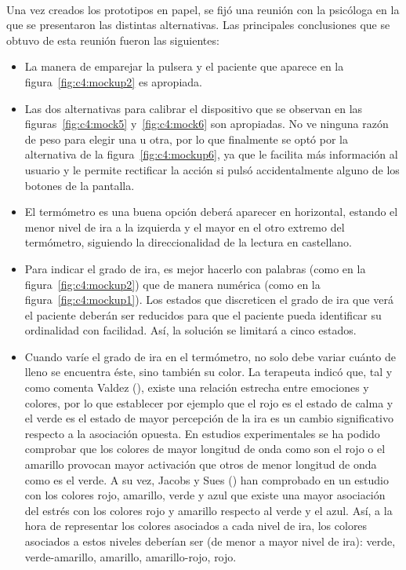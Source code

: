 \paragraph{}
Una vez creados los prototipos en papel, se fijó una reunión con la psicóloga en la que se presentaron las distintas alternativas. Las principales conclusiones que se obtuvo de esta reunión fueron las siguientes:
\begin{itemize}
    \item La manera de emparejar la pulsera y el paciente que aparece en la figura~\ref{fig:c4:mockup2} es apropiada.
    \item Las dos alternativas para calibrar el dispositivo que se observan en las figuras~\ref{fig:c4:mock5} y~\ref{fig:c4:mock6} son apropiadas. No ve ninguna razón de peso para elegir una u otra, por lo que finalmente se optó por la alternativa de la figura~\ref{fig:c4:mockup6}, ya que le facilita más información al usuario y le permite rectificar la acción si pulsó accidentalmente alguno de los botones de la pantalla.
    \item El termómetro es una buena opción deberá aparecer en horizontal, estando el menor nivel de ira a la izquierda y el mayor en el otro extremo del termómetro, siguiendo la direccionalidad de la lectura en castellano.
    \item Para indicar el grado de ira, es mejor hacerlo con palabras (como en la figura~\ref{fig:c4:mockup2}) que de manera numérica (como en la figura~\ref{fig:c4:mockup1}). Los estados que discreticen el grado de ira que verá el paciente deberán ser reducidos para que el paciente pueda identificar su ordinalidad con facilidad. Así, la solución se limitará a cinco estados.
    \item Cuando varíe el grado de ira en el termómetro, no solo debe variar cuánto de lleno se encuentra éste, sino también su color. La terapeuta indicó que, tal y como comenta Valdez (\citeyear{valdez1994effects}), existe una relación estrecha entre emociones y colores, por lo que establecer por ejemplo que el rojo es el estado de calma y el verde es el estado de mayor percepción de la ira es un cambio significativo respecto a la asociación opuesta. En estudios experimentales se ha podido comprobar que los colores de mayor longitud de onda como son el rojo o el amarillo provocan mayor activación que otros de menor longitud de onda como es el verde. A su vez, Jacobs y Sues (\citeyear{jacobs1975effects}) han comprobado en un estudio con los colores rojo, amarillo, verde y azul que existe una mayor asociación del estrés con los colores rojo y amarillo respecto al verde y el azul. Así, a la hora de representar los colores asociados a cada nivel de ira, los colores asociados a estos niveles deberían ser (de menor a mayor nivel de ira): verde, verde-amarillo, amarillo, amarillo-rojo, rojo.

\end{itemize}
